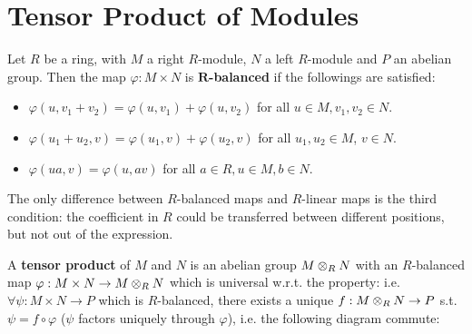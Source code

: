 \section{Tensor Product of Modules}

\begin{definition}
    Let $R$ be a ring, with $M$ a right $R$-module, $N$ a left $R$-module and $P$ an abelian group. Then the map $\varphi: M \times N$ is \textbf{$\mathbf{R}$-balanced} if the followings are satisfied:
    \begin{itemize}
        \item $\varphi(u, v_1 + v_2) = \varphi(u, v_1) + \varphi(u, v_2)$ for all $u\in M, v_1, v_2 \in N$.
        \item $\varphi(u_1 + u_2, v) = \varphi(u_1, v) + \varphi(u_2, v)$ for all $u_1, u_2 \in M$, $v \in N$.
        \item $\varphi(ua, v) = \varphi(u, av)$ for all $a \in R, u\in M, b\in N$.
    \end{itemize}
\end{definition}

\begin{remark}
    The only difference between $R$-balanced maps and $R$-linear maps is the third condition: the coefficient in $R$ could be transferred between different positions, but not out of the expression.
\end{remark}

\begin{definition}
    A \textbf{tensor product} of $M$ and $N$ is an abelian group $M \otimes_R N$ with an $R$-balanced map $\varphi: M \times N \to M \otimes_R N$ which is universal w.r.t. the property: i.e. $\forall \psi: M \times N \to P$ which is $R$-balanced, there exists a unique $f: M \otimes_R N \to P$ s.t. $\psi = f \circ \varphi$ ($\psi$ factors uniquely through $\varphi$), i.e. the following diagram commute:
    
    \begin{minipage}{\linewidth}
        \centering
    \end{minipage}
\end{definition}

